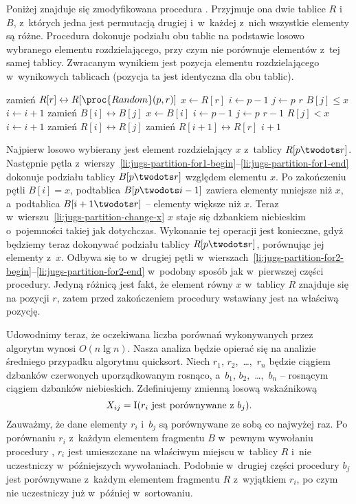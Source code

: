 Poniżej znajduje się zmodyfikowana procedura . Przyjmuje ona dwie tablice $R$ i~$B$, z~których jedna jest permutacją drugiej i~w~każdej z~nich wszystkie elementy są różne. Procedura dokonuje podziału obu tablic na podstawie losowo wybranego elementu rozdzielającego, przy czym nie porównuje elementów z~tej samej tablicy. Zwracanym wynikiem jest pozycja elementu rozdzielającego w~wynikowych tablicach (pozycja ta jest identyczna dla obu tablic).
\begin{codebox}
\li	zamień $R[r]\leftrightarrow R[\proc{Random}(p,r)]$
\li	$x\gets R[r]$
\li	$i\gets p-1$
\li	\For $j\gets p$ \To $r$ \label{li:jugs-partition-for1-begin}
\li		\Do
			\If $B[j]\le x$
\li				\Then
					$i\gets i+1$
\li					zamień $B[i]\leftrightarrow B[j]$
				\End
		\End \label{li:jugs-partition-for1-end}
\li	$x\gets B[i]$ \label{li:jugs-partition-change-x}
\li	$i\gets p-1$
\li	\For $j\gets p$ \To $r-1$ \label{li:jugs-partition-for2-begin}
\li		\Do
			\If $R[j]<x$
\li				\Then
					$i\gets i+1$
\li					zamień $R[i]\leftrightarrow R[j]$
				\End
		\End \label{li:jugs-partition-for2-end}
\li	zamień $R[i+1]\leftrightarrow R[r]$
\li	\Return $i+1$
\end{codebox}
Najpierw losowo wybierany jest element rozdzielający $x$ z~tablicy $R[p\twodots r]$. Następnie pętla  z~wierszy~\ref{li:jugs-partition-for1-begin}\nobreakdash--\ref{li:jugs-partition-for1-end} dokonuje podziału tablicy $B[p\twodots r]$ względem elementu $x$. Po zakończeniu pętli $B[i]=x$, podtablica $B[p\twodots i-1]$ zawiera elementy mniejsze niż $x$, a~podtablica $B[i+1\twodots r]$ -- elementy większe niż $x$. Teraz w~wierszu~\ref{li:jugs-partition-change-x} $x$ staje się dzbankiem niebieskim o~pojemności takiej jak dotychczas. Wykonanie tej operacji jest konieczne, gdyż będziemy teraz dokonywać podziału tablicy $R[p\twodots r]$, porównując jej elementy z~$x$. Odbywa się to w~drugiej pętli  w~wierszach~\ref{li:jugs-partition-for2-begin}\nobreakdash--\ref{li:jugs-partition-for2-end} w~podobny sposób jak w~pierwszej części procedury. Jedyną różnicą jest fakt, że element równy $x$ w~tablicy $R$ znajduje się na pozycji $r$, zatem przed zakończeniem procedury wstawiany jest na właściwą pozycję.

Udowodnimy teraz, że oczekiwana liczba porównań wykonywanych przez algorytm  wynosi $O(n\lg n)$. Nasza analiza będzie opierać się na analizie średniego przypadku algorytmu quicksort. Niech $r_1$, $r_2$,~\dots,~$r_n$ będzie ciągiem dzbanków czerwonych uporządkowanym rosnąco, a~$b_1$, $b_2$,~\dots,~$b_n$ -- rosnącym ciągiem dzbanków niebieskich. Zdefiniujemy zmienną losową wskaźnikową
\[
    X_{ij} = \operatorname{I}(\text{$r_i$ jest porównywane z~$b_j$}).
\]
Zauważmy, że dane elementy $r_i$ i~$b_j$ są porównywane ze sobą co najwyżej raz. Po porównaniu $r_i$ z~każdym elementem fragmentu $B$ w~pewnym wywołaniu procedury , $r_i$ jest umieszczane na właściwym miejscu w~tablicy $R$ i~nie uczestniczy w~późniejszych wywołaniach. Podobnie w~drugiej części procedury $b_j$ jest porównywane z~każdym elementem fragmentu $R$ z~wyjątkiem $r_i$, po czym nie uczestniczy już w~później w~sortowaniu.

